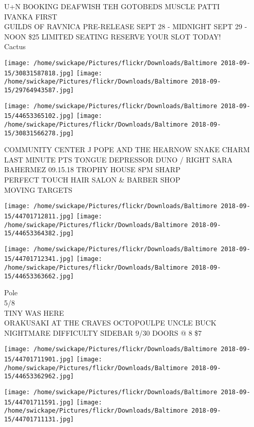 \documentclass[10pt,letterpaper]{article}
\begin{document}
U+N BOOKING DEAFWISH TEH GOTOBEDS MUSCLE PATTI\\
IVANKA FIRST\\
GUILDS OF RAVNICA PRE{-}RELEASE SEPT 28 {-} MIDNIGHT SEPT 29 {-} NOON \$25 LIMITED SEATING RESERVE YOUR SLOT TODAY!\\
Cactus\\
\pagebreak

\texttt{[image: /home/swickape/Pictures/flickr/Downloads/Baltimore 2018-09-15/30831587818.jpg]}
\texttt{[image: /home/swickape/Pictures/flickr/Downloads/Baltimore 2018-09-15/29764943587.jpg]}

\texttt{[image: /home/swickape/Pictures/flickr/Downloads/Baltimore 2018-09-15/44653365102.jpg]}
\texttt{[image: /home/swickape/Pictures/flickr/Downloads/Baltimore 2018-09-15/30831566278.jpg]}

COMMUNITY CENTER J POPE AND THE HEARNOW SNAKE CHARM\\
LAST MINUTE PTS TONGUE DEPRESSOR DUNO / RIGHT SARA BAHERMEZ 09.15.18 TROPHY HOUSE 8PM SHARP\\
PERFECT TOUCH HAIR SALON \& BARBER SHOP\\
MOVING TARGETS\\
\pagebreak

\texttt{[image: /home/swickape/Pictures/flickr/Downloads/Baltimore 2018-09-15/44701712811.jpg]}
\texttt{[image: /home/swickape/Pictures/flickr/Downloads/Baltimore 2018-09-15/44653364382.jpg]}

\texttt{[image: /home/swickape/Pictures/flickr/Downloads/Baltimore 2018-09-15/44701712341.jpg]}
\texttt{[image: /home/swickape/Pictures/flickr/Downloads/Baltimore 2018-09-15/44653363662.jpg]}

Pole\\
5/8\\
TINY WAS HERE\\
ORAKUSAKI AT THE CRAVES OCTOPOULPE UNCLE BUCK NIGHTMARE DIFFICULTY SIDEBAR 9/30 DOORS @ 8 \$7\\
\pagebreak

\texttt{[image: /home/swickape/Pictures/flickr/Downloads/Baltimore 2018-09-15/44701711901.jpg]}
\texttt{[image: /home/swickape/Pictures/flickr/Downloads/Baltimore 2018-09-15/44653362962.jpg]}

\texttt{[image: /home/swickape/Pictures/flickr/Downloads/Baltimore 2018-09-15/44701711591.jpg]}
\texttt{[image: /home/swickape/Pictures/flickr/Downloads/Baltimore 2018-09-15/44701711131.jpg]}
\end{document}

